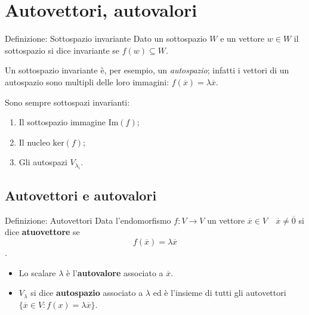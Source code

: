 \documentclass[x11names]{article}
\begin{document}
\newpage
\section{Autovettori, autovalori}



\begin{center}
\colorbox{myblue}{\begin{minipage}{5.75in}
\begin{blues}{Definizione: Sottospazio invariante}
Dato un sottospazio $W$ e un vettore  $w \in W$ il sottospazio si dice invariante se $f\left(w\right) \subseteq W$.

Un sottospazio invariante è, per esempio, un \textit{autospazio}; infatti i vettori di un autospazio sono multipli delle loro immagini: $f\left(\overline{x}\right) = \lambda \overline{x}$.
\end{blues}
\end{minipage}}        
\end{center}

\noindent
Sono sempre sottospazi invarianti:
\begin{enumerate}
	\item Il sottospazio immagine $\text{Im}(f)$;
	\item Il nucleo $\text{ker}(f)$;
	\item Gli autospazi $V_{\lambda_i}$.
\end{enumerate}






\subsection{Autovettori e autovalori}
\begin{center}
\colorbox{myblue}{\begin{minipage}{5.75in}
\begin{blues}{Definizione: Autovettori}
Data l'endomorfismo $f:V\rightarrow V$ un vettore $\overline{x} \in V \quad \overline{x} \neq \overline{0}$  si dice \textbf{atuovettore} se 
\[
f\left(\overline{x}\right) = \lambda \overline{x}
\].
\begin{itemize}
	\item Lo scalare $\lambda$ è l'\textbf{autovalore} associato a $\overline{x}$.
	\item $V_{\lambda}$ si dice \textbf{autospazio} associato a $\lambda$ ed è l'insieme di tutti gli autovettori $\{\overline{x} \in V: f\left(x\right) = \lambda \overline{x}\}$.
\end{itemize}
\end{blues}
\end{minipage}}        
\end{center}
\end{document}
